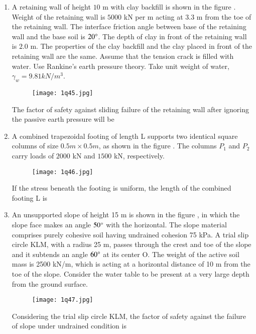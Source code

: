 \documentclass[journal,12pt,onecolumn]{article}
\theoremstyle{remark}
\begin{document}
\begin{enumerate}
\hfill{}

\item A retaining wall of height $10$ m with clay backfill is shown in the figure . Weight of the retaining wall is $5000$ kN per m acting at $3.3$ m from the toe of the retaining wall. The interface friction angle between base of the retaining wall and the base soil is $20\degree$. The depth of clay in front of the retaining wall is $2.0$ m. The properties of the clay backfill and the clay placed in front of the retaining wall are the same. Assume that the tension crack is filled with water. Use Rankine's earth pressure theory. Take unit weight of water, $\gamma_w = 9.81 kN/m^3$.
\begin{figure}[H]
    \centering
    \texttt{[image: 1q45.jpg]}
    \caption{}
    \label{fig:q45}
\end{figure}
The factor of safety  against sliding failure of the retaining wall after ignoring the passive earth pressure will be \underline{\hspace{2cm}}

\hfill{}

\item A combined trapezoidal footing of length L supports two identical square columns  of size $0.5 m \times 0.5 m$, as shown in the figure  . The columns $P_1$ and $P_2$ carry loads of $2000$ kN and $1500$ kN, respectively.
\begin{figure}[H]
    \centering
    \texttt{[image: 1q46.jpg]}
    \caption{}
    \label{fig:q46}
\end{figure}
If the stress beneath the footing is uniform, the length of the combined footing L  is \underline{\hspace{2cm}}

\hfill{}

\item An unsupported slope of height 15 m is shown in the figure , in which the slope face makes an angle $50\degree$ with the horizontal. The slope material comprises purely cohesive soil having undrained cohesion 75 kPa. A trial slip circle KLM, with a radius 25 m, passes through the crest and toe of the slope and it subtends an angle $60\degree$ at its center O. The weight of the active soil mass  is 2500 kN/m, which is acting at a horizontal distance of 10 m from the toe of the slope. Consider the water table to be present at a very large depth from the ground surface.
\begin{figure}[H]
    \centering
    \texttt{[image: 1q47.jpg]}
    \caption{}
    \label{fig:q47}
\end{figure}
Considering the trial slip circle KLM, the factor of safety against the failure of slope under undrained condition  is \underline{\hspace{2cm}}


\end{enumerate}
\end{document}
